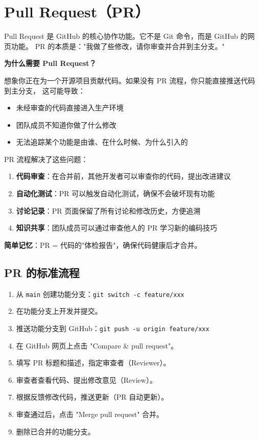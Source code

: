 \documentclass[12pt,a4paper,openany]{ctexbook}
\begin{document}
\section{Pull Request（PR）}

Pull Request 是 GitHub 的核心协作功能。它不是 Git 命令，而是 GitHub 的网页功能。
PR 的本质是："我做了些修改，请你审查并合并到主分支。"

\medskip
\textbf{为什么需要 Pull Request？}

想象你正在为一个开源项目贡献代码。如果没有 PR 流程，你只能直接推送代码到主分支，
这可能导致：
\begin{itemize}
  \item 未经审查的代码直接进入生产环境
  \item 团队成员不知道你做了什么修改
  \item 无法追踪某个功能是由谁、在什么时候、为什么引入的
\end{itemize}

PR 流程解决了这些问题：
\begin{enumerate}
  \item \textbf{代码审查}：在合并前，其他开发者可以审查你的代码，提出改进建议
  \item \textbf{自动化测试}：PR 可以触发自动化测试，确保不会破坏现有功能
  \item \textbf{讨论记录}：PR 页面保留了所有讨论和修改历史，方便追溯
  \item \textbf{知识共享}：团队成员可以通过审查他人的 PR 学习新的编码技巧
\end{enumerate}

\textbf{简单记忆}：PR = 代码的"体检报告"，确保代码健康后才合并。
\medskip

\subsection{PR 的标准流程}

\medskip
\begin{enumerate}[leftmargin=1.5em]
  \item 从 \texttt{main} 创建功能分支：\texttt{git switch -c feature/xxx}
  \item 在功能分支上开发并提交。
  \item 推送功能分支到 GitHub：\texttt{git push -u origin feature/xxx}
  \item 在 GitHub 网页上点击 "Compare \& pull request"。
  \item 填写 PR 标题和描述，指定审查者（Reviewer）。
  \item 审查者查看代码、提出修改意见（Review）。
  \item 根据反馈修改代码，推送更新（PR 自动更新）。
  \item 审查通过后，点击 "Merge pull request" 合并。
  \item 删除已合并的功能分支。
\end{enumerate}
\medskip
\end{document}
